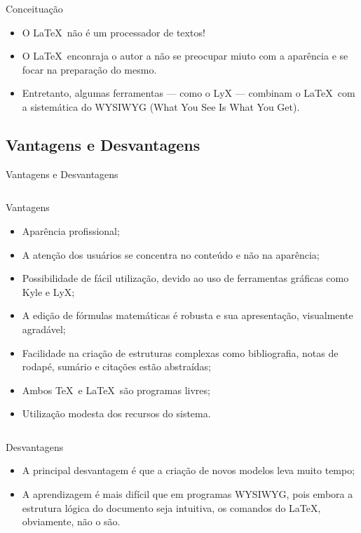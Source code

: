 \begin{frame}{Conceituação}
    \begin{itemize}
    \item<alert@1> O \LaTeX\ não é um processador de textos!
    \item O \LaTeX\ enconraja o autor a não se preocupar miuto com a aparência e se focar na preparação do mesmo.
    \item Entretanto, algumas ferramentas — como o LyX — combinam o \LaTeX\ com a sistemática do WYSIWYG (What You See Is What You Get).
    \end{itemize}
\end{frame}

\subsection{Vantagens e Desvantagens}

\begin{frame}[allowframebreaks]{Vantagens e Desvantagens}
    \begin{columns}
    \column{12cm}
    \begin{block}{Vantagens}
        \begin{itemize}
        \item Aparência profissional;
        \item A atenção dos usuários se concentra no conteúdo e não na aparência;
        \item Possibilidade de fácil utilização, devido ao uso de ferramentas gráficas como Kyle e LyX;
        \item A edição de fórmulas matemáticas é robusta e sua apresentação, visualmente agradável;
        \item Facilidade na criação de estruturas complexas como bibliografia, notas de rodapé, sumário e citações estão abstraídas;
        \item Ambos \TeX\ e \LaTeX\ são programas livres;
        \item Utilização modesta dos recursos do sistema.
        \end{itemize}
    \end{block}
    \end{columns}

    \begin{block}{Desvantagens}
        \begin{itemize}
        \item A principal desvantagem é que a criação de novos modelos leva muito tempo;
        \item A aprendizagem é mais difícil que em programas WYSIWYG, pois embora a estrutura lógica do documento seja intuitiva, os comandos do LaTeX, obviamente, não o são.
        \end{itemize}
    \end{block}
\end{frame}

